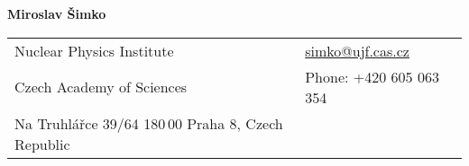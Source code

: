 \documentclass[a4paper,11pt,oneside]{article}
\begin{document}

\noindent  \LARGE{\textbf{Miroslav Šimko}}  \\
\vspace{-2ex}
\normalsize


\begin{center}
\begin{tabular}{l l}
 Nuclear Physics Institute   & \hspace{1in} \href{mailto:simko@ujf.cas.cz}{simko@ujf.cas.cz} \\
 Czech Academy of Sciences    & \hspace{1in} Phone: +420 605 063 354 \\
 Na Truhlářce 39/64            
 180$\,$00 Praha 8, Czech Republic 
\end{tabular}
\end{center}

\vspace{1em}

\end{document}
